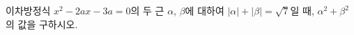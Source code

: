 이차방정식 $x^2-2ax-3a=0$의 두 근 $\alpha$, $\beta$에 대하여 $|\alpha|+|\beta|=\sqrt{7}$일 때, $\alpha^2+\beta^2$의 값을 구하시오. 
